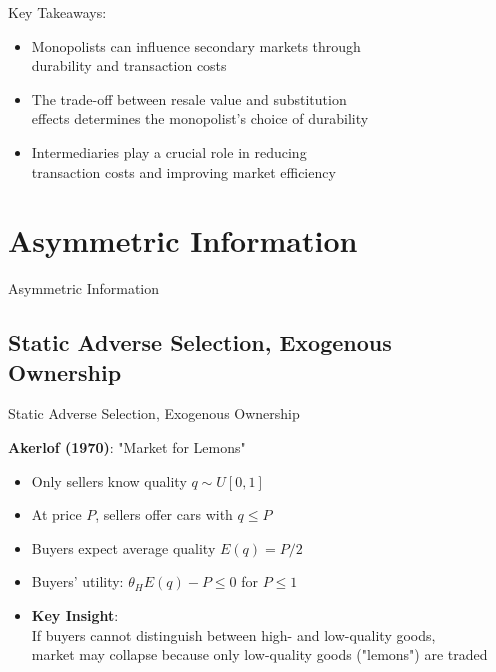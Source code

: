\documentclass[aspectratio=169]{beamer}  %
\begin{document}
\begin{frame}{Key Takeaways:}{}
\begin{spacing}{1.75}
{
    \begin{itemize}
        \item Monopolists can influence secondary markets through\\
        durability and transaction costs
        \item The trade-off between resale value and substitution\\
        effects determines the monopolist's choice of durability
        \item Intermediaries play a crucial role in reducing \\transaction costs and improving market efficiency
    \end{itemize}
    }
\end{spacing}
\end{frame}






\section{Asymmetric Information}


\begin{frame}{ }
\centering
{\Large Asymmetric Information}
\end{frame}

\subsection{Static Adverse Selection, Exogenous Ownership}


\begin{frame}{ Static Adverse Selection, Exogenous Ownership }{}
\begin{spacing}{1.5}

{\small
      \textbf{Akerlof (1970)}: "Market for Lemons"\\
\begin{itemize}

    \item Only sellers know quality $ q \sim U[0,1] $
    \item At price $ P $, sellers offer cars with $ q \leq P $
    \item Buyers expect average quality $ E(q) = P/2 $
    \item Buyers' utility: \quad $ \theta_H E(q) - P \leq 0 $ for $ P \leq 1 $

     \item[] \textbf{Key Insight}:\\
     If buyers cannot distinguish between high- and low-quality goods, \\
     market may collapse because only low-quality goods ("lemons") are traded
\end{itemize}
}
\end{spacing}
\end{frame}
\end{document}
